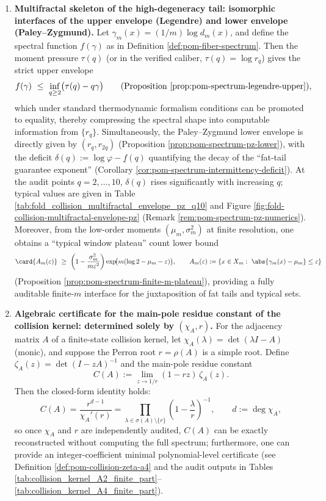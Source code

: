 \begin{enumerate}
  \item \textbf{Multifractal skeleton of the high-degeneracy tail: isomorphic interfaces of the upper envelope (Legendre) and lower envelope (Paley--Zygmund).}
  Let \(\gamma_m(x)=(1/m)\log d_m(x)\), and define the spectral function \(f(\gamma)\) as in Definition \ref{def:pom-fiber-spectrum}.
  Then the moment pressure \(\tau(q)\) (or in the verified caliber, \(\tau(q)=\log r_q\)) gives the strict upper envelope
  \[
  f(\gamma)\ \le\ \inf_{q\ge 2}\bigl(\tau(q)-q\gamma\bigr)
  \qquad\text{(Proposition \ref{prop:pom-spectrum-legendre-upper})},
  \]
  which under standard thermodynamic formalism conditions can be promoted to equality, thereby compressing the spectral shape into computable information from \(\{r_q\}\).
  Simultaneously, the Paley--Zygmund lower envelope is directly given by \((r_q,r_{2q})\) (Proposition \ref{prop:pom-spectrum-pz-lower}), with the deficit
  \(
  \delta(q):=\log\varphi-\underline f(q)
  \)
  quantifying the decay of the ``fat-tail guarantee exponent'' (Corollary \ref{cor:pom-spectrum-intermittency-deficit}).
  At the audit points \(q=2,\dots,10\), \(\delta(q)\) rises significantly with increasing \(q\); typical values are given in Table \ref{tab:fold_collision_multifractal_envelope_pz_q10} and Figure \ref{fig:fold-collision-multifractal-envelope-pz} (Remark \ref{rem:pom-spectrum-pz-numerics}).
  Moreover, from the low-order moments \((\mu_m,\sigma_m^2)\) at finite resolution, one obtains a ``typical window plateau'' count lower bound
  \[
  \card{A_m(\varepsilon)}
  \ \ge\
  \left(1-\frac{\sigma_m^2}{m\varepsilon^2}\right)
  \exp\!\bigl(m(\log 2-\mu_m-\varepsilon)\bigr),
  \qquad
  A_m(\varepsilon):=\{x\in X_m:\ \abs{\gamma_m(x)-\mu_m}\le \varepsilon\}
  \]
  (Proposition \ref{prop:pom-spectrum-finite-m-plateau}), providing a fully auditable finite-\(m\) interface for the juxtaposition of fat tails and typical sets.

  \item \textbf{Algebraic certificate for the main-pole residue constant of the collision kernel: determined solely by \texorpdfstring{$(\chi_A,r)$}{(chiA,r)}.}
  For the adjacency matrix \(A\) of a finite-state collision kernel, let \(\chi_A(\lambda)=\det(\lambda I-A)\) (monic), and suppose the Perron root \(r=\rho(A)\) is a simple root.
  Define
  \(
  \zeta_A(z)=\det(I-zA)^{-1}
  \)
  and the main-pole residue constant
  \[
  C(A):=\lim_{z\to 1/r}(1-rz)\,\zeta_A(z).
  \]
  Then the closed-form identity holds:
  \[
  C(A)=\frac{r^{d-1}}{\chi_A'(r)}
  =\prod_{\lambda\in\sigma(A)\setminus\{r\}}\left(1-\frac{\lambda}{r}\right)^{-1},
  \qquad d:=\deg\chi_A,
  \]
  so once \(\chi_A\) and \(r\) are independently audited, \(C(A)\) can be exactly reconstructed without computing the full spectrum; furthermore, one can provide an integer-coefficient minimal polynomial-level certificate (see Definition \ref{def:pom-collision-zeta-a4} and the audit outputs in Tables \ref{tab:collision_kernel_A2_finite_part}--\ref{tab:collision_kernel_A4_finite_part}).


\end{enumerate}
